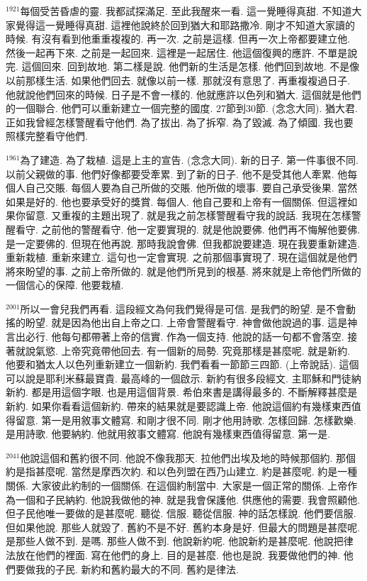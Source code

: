\documentclass{book}
\begin{document}
$^{1921}$每個受苦昏虐的靈.
我都試探滿足.
至此我醒來一看.
這一覺睡得真甜.
不知道大家覺得這一覺睡得真甜.
這裡他說終於回到猶大和耶路撒冷.
剛才不知道大家讀的時候.
有沒有看到他重重複複的.
再一次.
之前是這樣.
但再一次上帝都要建立他.
然後一起再下來.
之前是一起回來.
這裡是一起居住.
他這個復興的應許.
不單是說完.
這個回來.
回到故地.
第二樣是說.
他們新的生活是怎樣.
他們回到故地.
不是像以前那樣生活.
如果他們回去.
就像以前一樣.
那就沒有意思了.
再重複複過日子.
他就說他們回來的時候.
日子是不會一樣的.
他就應許以色列和猶大.
這個就是他們的一個聯合.
他們可以重新建立一個完整的國度.
27節到30節.
(念念大同).
猶大君.
正如我曾經怎樣警醒看守他們.
為了拔出.
為了拆窄.
為了毀滅.
為了傾國.
我也要照樣完整看守他們.

$^{1961}$為了建造.
為了栽植.
這是上主的宣告.
(念念大同).
新的日子.
第一件事很不同.
以前父親做的事.
他們好像都要受牽累.
到了新的日子.
他不是受其他人牽累.
他每個人自己交賬.
每個人要為自己所做的交賬.
他所做的壞事.
要自己承受後果.
當然如果是好的.
他也要承受好的獎賞.
每個人.
他自己要和上帝有一個關係.
但這裡如果你留意.
又重複的主題出現了.
就是我之前怎樣警醒看守我的說話.
我現在怎樣警醒看守.
之前他的警醒看守.
他一定要實現的.
就是他說要佛.
他們再不悔解他要佛.
是一定要佛的.
但現在他再說.
那時我說會佛.
但我都說要建造.
現在我要重新建造.
重新栽植.
重新來建立.
這句也一定會實現.
之前那個事實現了.
現在這個就是他們將來盼望的事.
之前上帝所做的.
就是他們所見到的根基.
將來就是上帝他們所做的一個信心的保障.
他要栽植.

$^{2001}$所以一會兒我們再看.
這段經文為何我們覺得是可信.
是我們的盼望.
是不會動搖的盼望.
就是因為他出自上帝之口.
上帝會警醒看守.
神會做他說過的事.
這是神言出必行.
他每句都帶著上帝的信實.
作為一個支持.
他說的話一句都不會落空.
接著就說氣慾.
上帝究竟帶他回去.
有一個新的局勢.
究竟那樣是甚麼呢.
就是新約.
他要和猶太人以色列重新建立一個新約.
我們看看一節節三四節.
(上帝說話).
這個可以說是耶利米蘇最寶貴.
最高峰的一個啟示.
新約有很多段經文.
主耶穌和門徒納新約.
都是用這個字眼.
也是用這個背景.
希伯來書是講得最多的.
不斷解釋甚麼是新約.
如果你看看這個新約.
帶來的結果就是要認識上帝.
他說這個約有幾樣東西值得留意.
第一是用敘事文體寫.
和剛才很不同.
剛才他用詩歌.
怎樣回歸.
怎樣歡樂.
是用詩歌.
他要納約.
他就用敘事文體寫.
他說有幾樣東西值得留意.
第一是.

$^{2041}$他說這個和舊約很不同.
他說不像我那天.
拉他們出埃及地的時候那個約.
那個約是指甚麼呢.
當然是摩西次約.
和以色列盟在西乃山建立.
約是甚麼呢.
約是一種關係.
大家彼此約制的一個關係.
在這個約制當中.
大家是一個正常的關係.
上帝作為一個和子民納約.
他說我做他的神.
就是我會保護他.
供應他的需要.
我會照顧他.
但子民他唯一要做的是甚麼呢.
聽從.
信服.
聽從信服.
神的話怎樣說.
他們要信服.
但如果他說.
那些人就毀了.
舊約不是不好.
舊約本身是好.
但最大的問題是甚麼呢.
是那些人做不到.
是嗎.
那些人做不到.
他說新約呢.
他說新約是甚麼呢.
他說把律法放在他們的裡面.
寫在他們的身上.
目的是甚麼.
他也是說.
我要做他們的神.
他們要做我的子民.
新約和舊約最大的不同.
舊約是律法.
\end{document}
